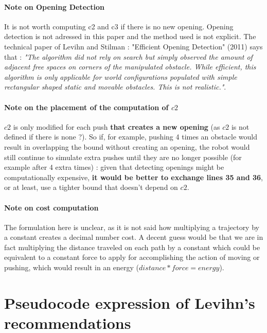 \paragraph{Note on Opening Detection}\label{opening_detection_note} It is not worth computing c2 and c3 if there is no new opening. Opening detection is not adressed in this paper and the method used is not explicit. The technical paper of Levihn and Stilman : "Efficient Opening Detection" (2011) says that : \textit{"The algorithm did not rely on search but simply observed the amount of adjacent free spaces on corners of the manipulated obstacle. While efficient, this algorithm is only applicable for world configurations populated with simple rectangular shaped static and movable obstacles. This is not realistic."}.

\paragraph{Note on the placement of the computation of $c2$}\label{c2_computation_note} $c2$ is only modified for each push \textbf{that creates a new opening} (as $c2$ is not defined if there is none ?). So if, for example, pushing 4 times an obstacle would result in overlapping the bound without creating an opening, the robot would still continue to simulate extra pushes until they are no longer possible (for example after 4 extra times) : given that detecting openings might be computationally expensive, \textbf{it would be better to exchange lines 35 and 36}, or at least, use a tighter bound that doesn't depend on $c2$.

\paragraph{Note on cost computation}\label{cost_computation_note} The formulation here is unclear, as it is not said how multiplying a trajectory by a constant creates a decimal number cost. A decent guess would be that we are in fact multiplying the distance traveled on each path by a constant which could be equivalent to a constant force to apply for accomplishing the action of moving or pushing, which would result in an energy ($distance*force=energy$).



\clearpage

\section{Pseudocode expression of Levihn's recommendations}

